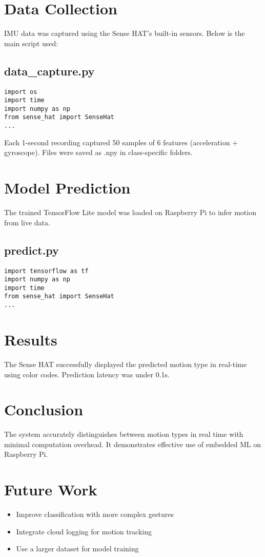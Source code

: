 \documentclass[12pt,a4paper]{article}
\begin{document}
\section{Data Collection}
IMU data was captured using the Sense HAT's built-in sensors. Below is the main script used:

\subsection*{data\_capture.py}
\begin{lstlisting}[caption={Data Capture Script}]
% Paste from data_capture.py
import os
import time
import numpy as np
from sense_hat import SenseHat
...
\end{lstlisting}

Each 1-second recording captured 50 samples of 6 features (acceleration + gyroscope). Files were saved as .npy in class-specific folders.

\section{Model Prediction}
The trained TensorFlow Lite model was loaded on Raspberry Pi to infer motion from live data.

\subsection*{predict.py}
\begin{lstlisting}[caption={Real-time Prediction Script}]
% Paste from predict.py
import tensorflow as tf
import numpy as np
import time
from sense_hat import SenseHat
...
\end{lstlisting}

\section{Results}
The Sense HAT successfully displayed the predicted motion type in real-time using color codes. Prediction latency was under 0.1s.

\section{Conclusion}
The system accurately distinguishes between motion types in real time with minimal computation overhead. It demonstrates effective use of embedded ML on Raspberry Pi.

\section{Future Work}
\begin{itemize}
    \item Improve classification with more complex gestures
    \item Integrate cloud logging for motion tracking
    \item Use a larger dataset for model training
\end{itemize}
\end{document}

